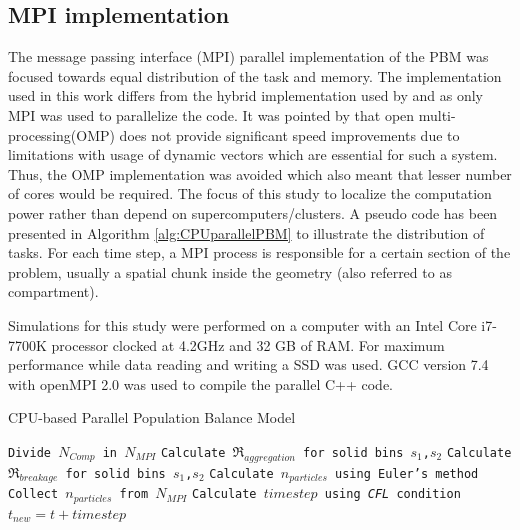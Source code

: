 \documentclass[preprint,10pt,authoryear,review]{elsarticle}
\begin{document}
\subsection{MPI implementation}
The message passing interface (MPI) parallel implementation of the PBM was 
focused towards equal distribution of the task and memory. The implementation 
used in this work differs from the hybrid implementation used by \citep{Bettencourt2017}
and \cite{Sampat2018} as only MPI was used to parallelize the code. It 
was pointed by \cite{Sampat2018} that open multi-processing(OMP) does not 
provide significant speed improvements due to limitations with usage of 
dynamic vectors which are essential for such a system. Thus, the OMP 
implementation was avoided which also meant that lesser number of cores 
would be required. The focus of this study to localize the computation power 
rather than depend on supercomputers/clusters.  
A pseudo code has been presented in Algorithm \ref{alg:CPUparallelPBM}
to illustrate the distribution of tasks. For each time step, a MPI process is responsible 
for a certain section of the problem, usually a spatial chunk inside the geometry 
(also referred to as compartment).  



Simulations for this study were performed on a computer with an Intel Core i7-7700K 
processor clocked at 4.2GHz and 32 GB of RAM. For maximum performance while 
data reading and writing a SSD was used. GCC version 7.4 with openMPI 2.0 
was used to compile the parallel C++ code.

\begin{algorithm}
     \scriptsize
     \caption{CPU-based Parallel Population Balance Model}
     \label{alg:CPUparallelPBM}
     \begin{algorithmic}[1]
     \State \texttt{Divide $N_{Comp}$ in $N_{MPI}$}
     \State \texttt{Calculate $\Re_{aggregation}$ for solid bins $s_1$,$s_2$}
     \State \texttt{Calculate $\Re_{breakage}$ for solid bins $s_1$,$s_2$}
     \State \texttt{Calculate $n_{particles}$ using Euler's method}
     \EndFor
     \State \texttt{Collect $n_{particles}$ from $N_{MPI}$}
     \State \texttt{Calculate $timestep$ using \textit{CFL} condition}
     \State \texttt{$t_{new} = t + timestep$}
     \EndWhile
     \EndProcedure
     \end{algorithmic}
 \end{algorithm}   
\end{document}
